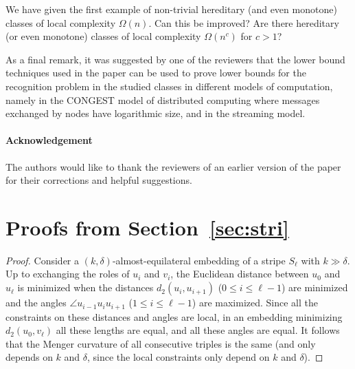 \documentclass[a4paper,reqno, 12pt]{amsart}
\begin{document}
\medskip

We have given the first example of  non-trivial hereditary (and even
monotone) classes of local complexity $\Omega(n)$. Can this be
improved? Are there hereditary (or even monotone) classes of local
complexity $\Omega(n^{c})$ for $c>1$?

\medskip

As a final remark, it was suggested by one of the reviewers that the lower bound techniques used in the
paper can be used to prove lower bounds for the recognition problem in
the studied classes in different models of
computation, namely in the \textsf{CONGEST} model of distributed
computing where messages exchanged by nodes have logarithmic size, and
in the streaming model.

\bigskip

 \paragraph{\bf Acknowledgement} The authors would like to thank the
 reviewers of an earlier version of the paper for their corrections
 and helpful suggestions.




\appendix
\section{Proofs from Section~\ref{sec:stri}}
\label{sec:prstri}

\lemcurv*

\begin{proof}
Consider a $(k,\delta)$-almost-equilateral embedding of a stripe
$S_\ell$ with  $k \gg \delta$. Up to exchanging the roles of $u_i$ and
$v_i$, the Euclidean distance between $u_0$
and $u_\ell$ is minimized when the distances $d_2(u_i,u_{i+1})$ ($0\le i
\le \ell-1$) are minimized and the angles $\angle u_{i-1}u_{i}u_{i+1}$  ($1\le i \le \ell-1$) are maximized. Since all the constraints on these distances and angles are
local, in an embedding minimizing $d_2(u_0,v_\ell)$ all these lengths
are equal, and all these angles are equal. It follows that the Menger
curvature of all consecutive triples is the same (and only depends on
$k$ and $\delta$, since the local constraints only depend on $k$ and
$\delta$).
\end{proof}

\lemcurvv*
\end{document}
